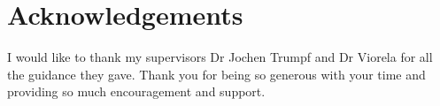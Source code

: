 \chapter*{Acknowledgements}

I would like to thank my supervisors Dr Jochen Trumpf and Dr Viorela for all the guidance they gave. Thank you for being so generous with your time and providing so much encouragement and support.

